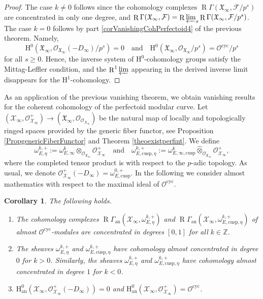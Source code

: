 \documentclass[11pt]{article}
\newcommand{\quand}{\quad\text{and}\quad}
\newcommand{\an}{\mathrm{an}}
\newcommand{\cusp}{\mathrm{cusp}}
\newcommand{\cyc}{\mathrm{cyc}}
\newcommand{\wotimes}{\mathbin{\widehat\otimes}}
\numberwithin{equation}{section}
\newtheorem{cor}[prop]{Corollary}
\theoremstyle{definition}
\newcommand{\bb}[1]{\mathbb{#1}}
\newcommand{\n}[1]{\mathcal{#1}}
\newcommand{\f}[1]{\mathfrak{#1}}
\newcommand{\s}[1]{\mathscr{#1}}
\DeclareMathOperator{\R}{R}
\begin{document}
\begin{proof}
The case $k\neq 0$ follows since the cohomology complexes $\R\Gamma(\f{X}_{\infty}, \n{F}/p^s)$ are concentrated in only one degree, and $\R \Gamma(\f{X}_{\infty},\n{F})=\R \varprojlim_s \R\Gamma(\f{X}_{\infty}, \n{F}/p^s)$. The case $k=0$ follows by part \eqref{corVanishingCohPerfectoid4} of the previous theorem. Namely,
\[
\mathrm{H}^0(\f{X}_{\infty}, \s{O}_{\f{X}_{\infty}}(-D_{\infty})/p^s)=0\quand\mathrm{H}^0(\f{X}_{\infty}, \s{O}_{\f{X}_{\infty}}/p^s)=\n{O}^{\cyc}/p^s
\]
for all $s\geq 0$. Hence, the inverse system of $\mathrm{H}^0$-cohomology groups satisfy the Mittag-Leffler condition, and the $\R^1 \varprojlim$ appearing in the derived inverse limit disappears for the $\mathrm{H}^1$-cohomology.
\end{proof}

As an application of the previous vanishing theorem, we obtain vanishing results for the coherent cohomology of the perfectoid modular curve. Let $(\n{X}_{\infty}, \s{O}_{\n{X}_{\infty}}^+)\to (\f{X}_{\infty}, \s{O}_{\s{O}_{X_{\infty}}})$ be the natural map of locally and topologically ringed spaces provided by the generic fiber functor, see Proposition \ref{PropgenericFiberFunctor} and Theorem \ref{theoexistperfint}. We define
\[
\omega^{k,+}_{E,\eta}:= \omega_{E,\infty}^k \otimes_{\s{O}_{\f{X}_{\infty}}} \s{O}_{\n{X}_{\infty}}^+\quand\omega^{k,+}_{E,\cusp,\eta}:=\omega_{E,\infty,\cusp}^k\wotimes_{\s{O}_{\f{X}_{\infty}}} \s{O}_{\n{X}_{\infty}}^+,
\]
where the completed tensor product is with respect to the $p$-adic topology. As usual, we denote $\s{O}_{\n{X}_{\infty}}^+(-D_{\infty})= \omega_{E,\cusp}^{0,+}$. In the following we consider almost mathematics with respect to the maximal ideal of $\n{O}^{\cyc}$.

\begin{cor}
\label{CoroCoherentPerfCurve}
The following holds.

\begin{enumerate}
\item The cohomology complexes $\R\Gamma_{\an}(\n{X}_{\infty}, \omega_{E,\eta}^{k,+})$ and $\R\Gamma_{\an}(\n{X}_{\infty}, \omega_{E,\cusp,\eta}^{k,+})$ of \hbox{almost} $\n{O}^{\cyc}$-modules are concentrated in degrees $[0,1]$ for all $k\in \bb{Z}$.

\item The sheaves $\omega_{E,\eta}^{k,+}$ and $\omega_{E,\cusp,\eta}^{k,+}$ have cohomology almost concentrated in degree $0$ for $k>0$. Similarly, the sheaves $\omega_{E,\eta}^{k,+}$ and $\omega_{E,\cusp,\eta}^{k,+}$ have cohomology almost concentrated in degree $1$ for $k<0$.

\item $\mathrm{H}_{\an}^0(\n{X}_{\infty}, \s{O}_{\n{X}_{\infty}}^+(-D_{\infty}))= 0$ and $\mathrm{H}_{\an}^0(\n{X}_{\infty}, \s{O}_{\n{X}_{\infty}}^+)= \n{O}^{\cyc} $.
\end{enumerate}
\end{cor}
\end{document}

